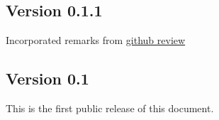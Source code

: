 \subsection{Version 0.1.1}
Incorporated remarks from
\href{https://github.com/acsl-language/acsl/pull/64}{github review}

\subsection{Version 0.1}
This is the first public release of this document.
